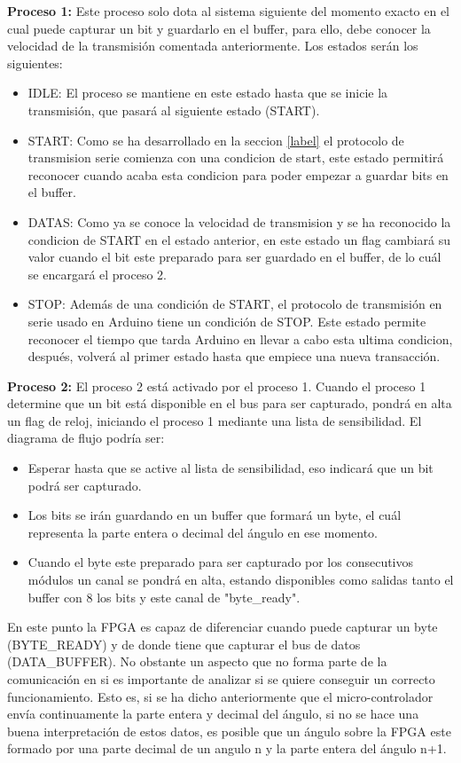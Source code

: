 \textbf{Proceso 1:} Este proceso solo dota al sistema siguiente del momento exacto en el cual puede capturar un bit y guardarlo en el buffer, para ello, debe conocer la velocidad de la transmisión comentada anteriormente. Los estados serán los siguientes: 

\begin{itemize}
	\item IDLE: El proceso se mantiene en este estado hasta que se inicie la transmisión, que pasará al siguiente estado (START).
	\item START: Como se ha desarrollado en la seccion \ref{label} el protocolo de transmision serie comienza con una condicion de start, este estado permitirá reconocer cuando acaba esta condicion para poder empezar a guardar bits en el buffer. 
	\item DATAS: Como ya se conoce la velocidad de transmision y se ha reconocido la condicion de START en el estado anterior, en este estado un flag cambiará su valor cuando el bit este preparado para ser guardado en el buffer, de lo cuál se encargará el proceso 2.
	\item STOP: Además de una condición de START, el protocolo de transmisión en serie usado en Arduino tiene un condición de STOP. Este estado permite reconocer el tiempo que tarda Arduino en llevar a cabo esta ultima condicion, después, volverá al primer estado hasta que empiece una nueva transacción.
\end{itemize}

\textbf{Proceso 2:} El proceso 2 está activado por el proceso 1. Cuando el proceso 1 determine que un bit está disponible en el bus para ser capturado, pondrá en alta un flag de reloj, iniciando el proceso 1 mediante una lista de sensibilidad. El diagrama de flujo podría ser:

\begin{itemize}
	\item Esperar hasta que se active al lista de sensibilidad, eso indicará que un bit podrá ser capturado.
	\item Los bits se irán guardando en un buffer que formará un byte, el cuál representa la parte entera o decimal del ángulo en ese momento.
	\item Cuando el byte este preparado para ser capturado por los consecutivos módulos un canal se pondrá en alta, estando disponibles como salidas tanto el buffer con 8 los bits y este canal de "byte\_ready".
\end{itemize}

En este punto la FPGA es capaz de diferenciar cuando puede capturar un byte (BYTE\_READY) y de donde tiene que capturar el bus de datos (DATA\_BUFFER). No obstante un aspecto que no forma parte de la comunicación en si es importante de analizar si se quiere conseguir un correcto funcionamiento. Esto es, si se ha dicho anteriormente que el micro-controlador envía continuamente la parte entera y decimal del ángulo, si no se hace una buena interpretación de estos datos, es posible que un ángulo sobre la FPGA este formado por una parte decimal de un angulo n y la parte entera del ángulo n+1. \newline


